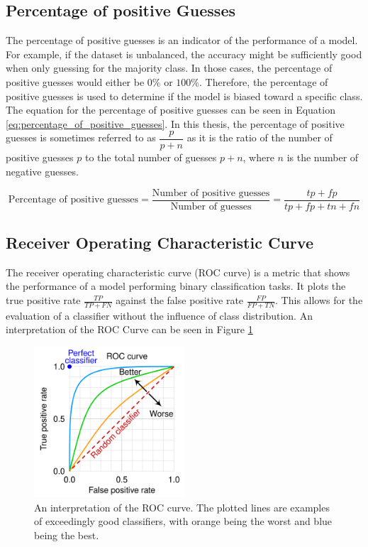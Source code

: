 \subsection{Percentage of positive Guesses}

The percentage of positive guesses is an indicator of the performance of a model. For example, if the dataset is unbalanced, the accuracy might be sufficiently good when only guessing for the majority class. In those cases, the percentage of positive guesses would either be $0\%$ or $100\%$. Therefore, the percentage of positive guesses is used to determine if the model is biased toward a specific class. The equation for the percentage of positive guesses can be seen in Equation \ref{eq:percentage_of_positive_guesses}. In this thesis, the percentage of positive guesses is sometimes referred to as $\dfrac{p}{p + n}$ as it is the ratio of the number of positive guesses $p$ to the total number of guesses $p + n$, where $n$ is the number of negative guesses.

\begin{equation}
    \label{eq:percentage_of_positive_guesses}
    \text{Percentage of positive guesses} = \frac{\text{Number of positive guesses}}{\text{Number of guesses}} = \frac{tp + fp}{tp + fp + tn + fn}
\end{equation}

\subsection{Receiver Operating Characteristic Curve}

The receiver operating characteristic curve (ROC curve) is a metric that shows the performance of a model performing binary classification tasks. It plots the true positive rate \(\frac{TP}{TP+FN}\) against the false positive rate \(\frac{FP}{FP+TN}\). This allows for the evaluation of a classifier without the influence of class distribution. An interpretation of the ROC Curve can be seen in Figure \ref{fig:roc-curve}


\begin{figure}[ht]
    \centering
    \includegraphics[width=0.5\textwidth]{figures/Roc_curve.png}
    \caption[An interpretation of the ROC Curve]{An interpretation of the ROC curve. The plotted lines are examples of exceedingly good classifiers, with orange being the worst and blue being the best.\cite{ROC-Drawing}}
    \label{fig:roc-curve}
\end{figure}

